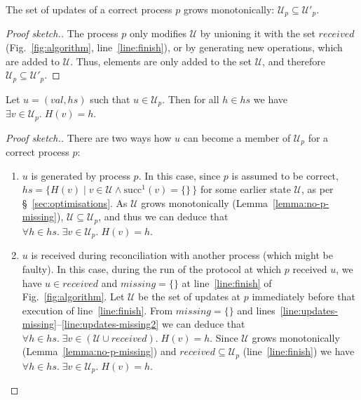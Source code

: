 \documentclass[manuscript,anonymous]{acmart}
\begin{document}
\begin{lemma}\label{lemma:no-p-missing}
The set of updates of a correct process $p$ grows monotonically: $\mathcal{U}_p \subseteq \mathcal{U}'_p$.
\end{lemma}
\begin{proof}[Proof sketch.]
The process $p$ only modifies $\mathcal{U}$ by unioning it with the set $\mathit{received}$ (Fig.~\ref{fig:algorithm}, line~\ref{line:finish}), or by generating new operations, which are added to $\mathcal{U}$.
Thus, elements are only added to the set $\mathcal{U}$, and therefore $\mathcal{U}_p \subseteq \mathcal{U}'_p$.
\end{proof}

\begin{lemma}\label{lemma:no-dangling}
Let $u = (\mathit{val}, \mathit{hs})$ such that $u \in \mathcal{U}_p$.
Then for all $h \in \mathit{hs}$ we have $\exists v \in \mathcal{U}_p.\; H(v) = h$.
\end{lemma}
\begin{proof}[Proof sketch.]
There are two ways how $u$ can become a member of $\mathcal{U}_p$ for a correct process $p$:
\begin{enumerate}
    \item $u$ is generated by process $p$.
    In this case, since $p$ is assumed to be correct, $\mathit{hs} = \{H(v) \mid v \in \mathcal{U} \wedge \mathrm{succ}^1(v) = \{\}\,\}$ for some earlier state $\mathcal{U}$, as per \S~\ref{sec:optimisations}.
    As $\mathcal{U}$ grows monotonically (Lemma~\ref{lemma:no-p-missing}), $\mathcal{U} \subseteq \mathcal{U}_p$, and thus we can deduce that $\forall h \in \mathit{hs}.\; \exists v \in \mathcal{U}_p.\; H(v) = h$.
    \item $u$ is received during reconciliation with another process (which might be faulty).
    In this case, during the run of the protocol at which $p$ received $u$, we have $u \in \mathit{received}$ and $\mathit{missing} = \{\}$ at line~\ref{line:finish} of Fig.~\ref{fig:algorithm}.
    Let $\mathcal{U}$ be the set of updates at $p$ immediately before that execution of line~\ref{line:finish}.
    From $\mathit{missing} = \{\}$ and lines~\ref{line:updates-missing}--\ref{line:updates-missing2} we can deduce that $\forall h \in \mathit{hs}.\; \exists v \in (\mathcal{U} \cup \mathit{received}).\; H(v) = h$.
    Since $\mathcal{U}$ grows monotonically (Lemma~\ref{lemma:no-p-missing}) and $\mathit{received} \subseteq \mathcal{U}_p$ (line~\ref{line:finish}) we have $\forall h \in \mathit{hs}.\; \exists v \in \mathcal{U}_p.\; H(v) = h$.
\end{enumerate}
\end{proof}
\end{document}
